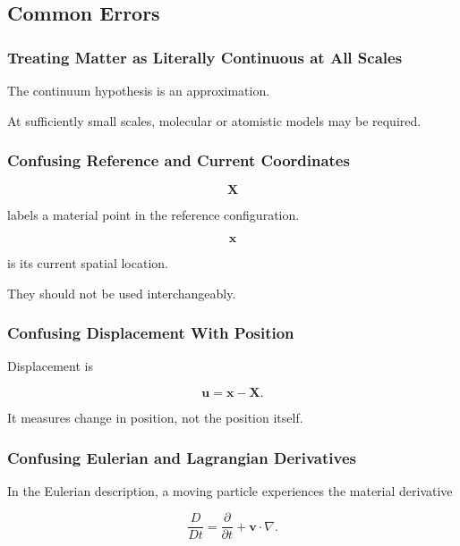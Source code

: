 \subsection{Common Errors}
\label{subsec:continuum-mechanics-common-errors}

\subsubsection{Treating Matter as Literally Continuous at All Scales}

The continuum hypothesis is an approximation.

At sufficiently small scales, molecular or atomistic models may be required.

\subsubsection{Confusing Reference and Current Coordinates}

\[
\mathbf{X}
\]

labels a material point in the reference configuration.

\[
\mathbf{x}
\]

is its current spatial location.

They should not be used interchangeably.

\subsubsection{Confusing Displacement With Position}

Displacement is

\[
\boxed{
\mathbf{u}
=
\mathbf{x}-\mathbf{X}.
}
\]

It measures change in position, not the position itself.

\subsubsection{Confusing Eulerian and Lagrangian Derivatives}

In the Eulerian description, a moving particle experiences the material
derivative

\[
\frac{D}{Dt}
=
\frac{\partial}{\partial t}
+
\mathbf{v}\cdot\nabla.
\]

